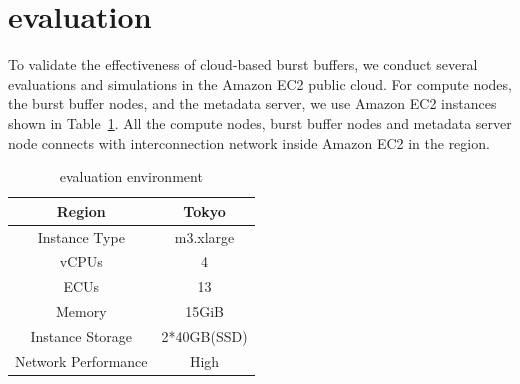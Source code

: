 \section{evaluation}
\label{sec:evaluation}

To validate the effectiveness of cloud-based burst buffers, 
we conduct several evaluations and simulations in the Amazon EC2 public cloud.
For compute nodes, the burst buffer nodes, and the metadata server, 
we use Amazon EC2 instances shown in Table~\ref{evaluation:amazon_environment}.
All the compute nodes, burst buffer nodes and metadata server node connects with
interconnection network inside Amazon EC2 in the region.

\begin{table}[h]
\centering
\begin{tabular}{|c|c|}
\hline
\cellcolor{lightgray} Region				&		Tokyo		\\
\hline
\cellcolor{lightgray} Instance Type		&		m3.xlarge	\\
\hline
\cellcolor{lightgray} vCPUs				&		4			\\
\hline
\cellcolor{lightgray} ECUs				&		13			\\
\hline
\cellcolor{lightgray} Memory				&		15GiB		\\
\hline
\cellcolor{lightgray} Instance Storage	&		2*40GB(SSD)	\\
\hline
\cellcolor{lightgray} Network Performance	&		High		\\
\hline
\end{tabular}
\caption{evaluation environment}
\label{evaluation:amazon_environment}
\end{table}


